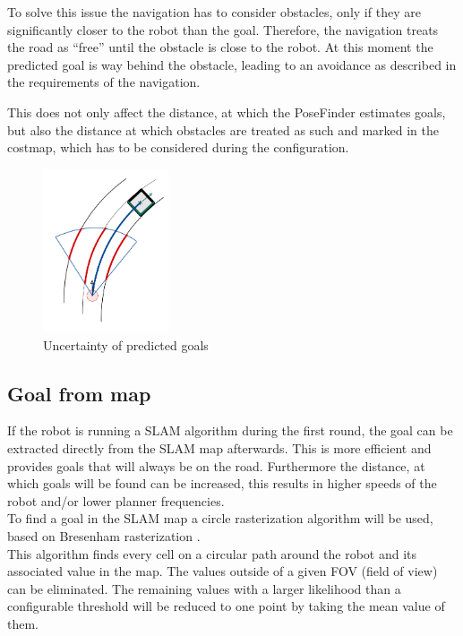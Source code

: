 To solve this issue the navigation has to consider obstacles, only if they are significantly closer to the robot than the goal. Therefore, the navigation treats the road as ``free'' until the obstacle is close to the robot. At this moment the predicted goal is way behind the obstacle, leading to an avoidance as described in the requirements of the navigation.

This does not only affect the distance, at which the PoseFinder estimates goals, but also the distance at which obstacles are treated as such and marked in the costmap, which has to be considered during the configuration.

\begin{figure}[H]
\centering
	\includegraphics[width=0.33\textwidth]{Pictures/finding goal in obstacle}
	\caption{Uncertainty of predicted goals}
	\label{goaluncertainty}
\end{figure}


\subsection{Goal from map}

If the robot is running a SLAM algorithm during the first round, the goal can be extracted directly from the SLAM map afterwards. This is more efficient and provides goals that will always be on the road. Furthermore the distance, at which goals will be found can be increased, this results in higher speeds of the robot and/or lower planner frequencies.\\

To find a goal in the SLAM map a circle rasterization algorithm will be used, based on Bresenham rasterization \cite{ComputerGraphics}.\\

This algorithm finds every cell on a circular path around the robot and its associated value in the map. The values outside of a given FOV (field of view) can be eliminated. The remaining values with a larger likelihood than a configurable threshold will be reduced to one point by taking the mean value of them.\\

